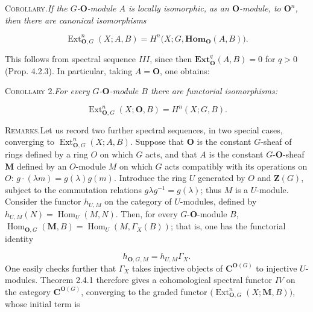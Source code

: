 \clearpage
{}

\textsc{Corollary.}\quad \textit{If the $G$-${\mathbf O}$-module $A$ is
locally isomorphic, as an ${\mathbf O}$-module, to ${\mathbf O}^n$, then there are canonical
isomorphisms}

\begin{equation}
\operatorname{Ext}_{{\mathbf O},G}^n(X;A,B)
  =H^n\bigl(X;G,\mathbf{Hom}_{\mathbf O}(A,B)\bigr).
\tag{5.6.12}
\end{equation}

This follows from spectral sequence $III$, since then
$\mathbf{Ext}_{\mathbf O}^q(A,B)=0$ for $q>0$ (Prop. 4.2.3). In particular, taking
$A={\mathbf O}$, one obtains:

\textsc{Corollary 2.}\quad \textit{For every $G$-${\mathbf O}$-module $B$
there are functorial isomorphisms:}

\begin{equation}
\operatorname{Ext}_{{\mathbf O},G}^n(X;{\mathbf O},B)=H^n(X;G,B).
\tag{5.6.14}
\end{equation}

\textsc{Remarks.}\quad Let us record two further spectral sequences,
in two special cases, converging to $\operatorname{Ext}_{{\mathbf O},G}^n(X;A,B)$.
Suppose that ${\mathbf O}$ is the constant $G$-sheaf of rings defined by a ring $O$ on
which $G$ acts, and that $A$ is the constant $G$-${\mathbf O}$-sheaf $\mathbf M$
defined by an $O$-module $M$ on which $G$ acts compatibly with its operations
on $O$: $g\cdot(\lambda m)=g(\lambda)g(m)$. Introduce the ring $U$ generated
by $O$ and $\mathbf Z(G)$, subject to the commutation relations
$g\lambda g^{-1}=g(\lambda)$; thus $M$ is a $U$-module. Consider the functor
$h_{U,M}$ on the category of $U$-modules, defined by
$h_{U,M}(N)=\operatorname{Hom}_U(M,N)$. Then, for every $G$-${\mathbf O}$-module $B$,
$\operatorname{Hom}_{{\mathbf O},G}({\mathbf M},B)=\operatorname{Hom}_U(M,\Gamma_X(B))$; that is,
one has the functorial identity

\begin{equation}
h_{{\mathbf O},G,M}=h_{U,M}\Gamma_X.
\tag{5.6.5 bis}
\end{equation}
One easily checks further that $\Gamma_X$ takes injective objects of
${\mathbf C}^{{\mathbf O}(G)}$ to injective $U$-modules. Theorem 2.4.1 therefore gives a
cohomological spectral functor $IV$ on the category ${\mathbf C}^{{\mathbf O}(G)}$, converging to
the graded functor $\bigl(\operatorname{Ext}_{{\mathbf O},G}^n(X;{\mathbf M},B)\bigr)$, whose
initial term is

